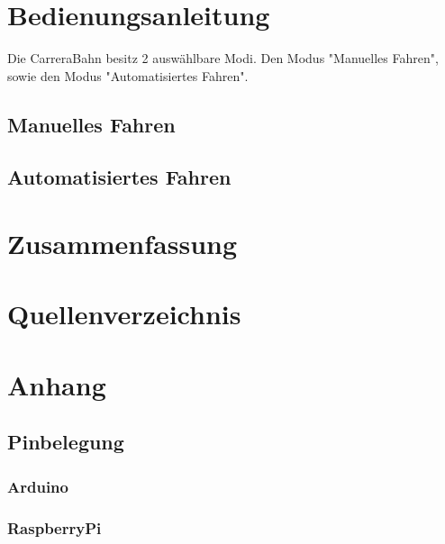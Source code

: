 \documentclass[a4paper, 11pt]{scrartcl}
\begin{document}
	\newpage
	
\section{Bedienungsanleitung}
Die CarreraBahn besitz 2 auswählbare Modi. Den Modus "Manuelles Fahren", sowie den Modus "Automatisiertes Fahren".
\subsection{Manuelles Fahren}

\subsection{Automatisiertes Fahren}
\newpage

\section{Zusammenfassung}
\newpage

\section{Quellenverzeichnis}
\newpage

\section{Anhang}
\subsection{Pinbelegung}
\subsubsection{Arduino}
\subsubsection{RaspberryPi}
\end{document}
